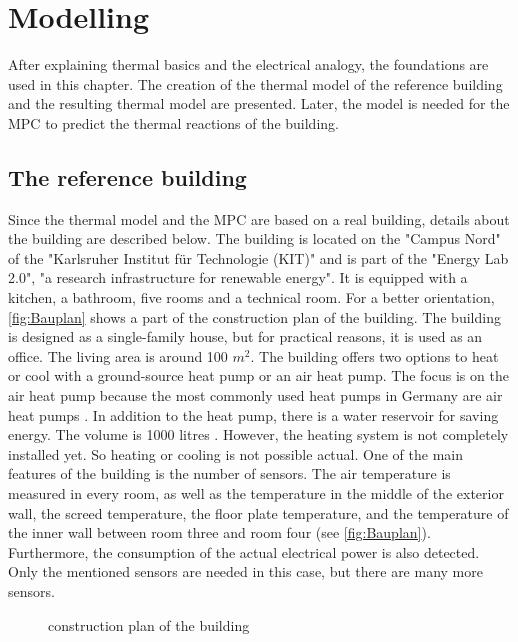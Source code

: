 \chapter{Modelling}
\label{ch:modelling}
After explaining thermal basics and the electrical analogy, the foundations are used in this chapter. The creation of the thermal model of the reference building and the resulting thermal model are presented. Later, the model is needed for the MPC to predict the thermal reactions of the building.

\section{The reference building}
\label{section:building}
    Since the thermal model and the MPC are based on a real building, details about the building are described below.
    \newline
    The building is located on the "Campus Nord" of the "Karlsruher Institut für Technologie (KIT)" and is part of the "Energy Lab 2.0", "a research infrastructure for renewable energy"\cite{KIT.2021}. It is equipped with a kitchen, a bathroom, five rooms and a technical room. For a better orientation, \autoref{fig:Bauplan} shows a part of the construction plan of the building. The building is designed as a single-family house, but for practical reasons, it is used as an office. The living area is around 100 $m^2$. The building offers two options to heat or cool with a ground-source heat pump or an air heat pump. The focus is on the air heat pump because the most commonly used heat pumps in Germany are air heat pumps \cite{bwp.2021}. In addition to the heat pump, there is a water reservoir for saving energy. The volume is 1000 litres \cite{Oskar}. However, the heating system is not completely installed yet. So heating or cooling is not possible actual.
    \newline
    One of the main features of the building is the number of sensors. The air temperature is measured in every room, as well as the temperature in the middle of the exterior wall, the screed temperature, the floor plate temperature, and the temperature of the inner wall between room three and room four (see \autoref{fig:Bauplan}). Furthermore, the consumption of the actual electrical power is also detected. Only the mentioned sensors are needed in this case, but there are many more sensors.
    \begin{figure}
        \centering
        \def\svgwidth{320pt}
        
        \caption{construction plan of the building \cite{Bauplan}}
        \label{fig:Bauplan}
    \end{figure}
    
